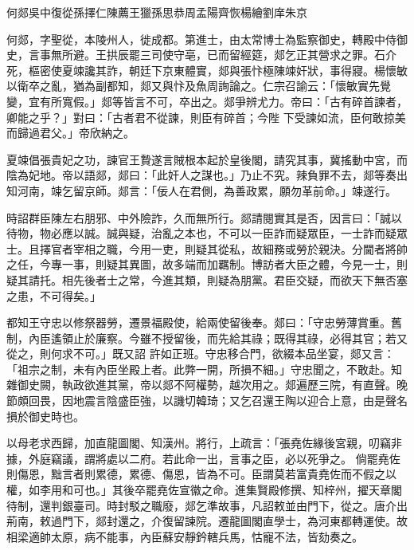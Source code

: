 
\begin{pinyinscope}

 何郯吳中復從孫擇仁陳薦王獵孫思恭周孟陽齊恢楊繪劉庠朱京



 何郯，字聖從，本陵州人，徙成都。第進士，由太常博士為監察御史，轉殿中侍御史，言事無所避。王拱辰罷三司使守亳，已而留經筵，郯乞正其營求之罪。石介死，樞密使夏竦讒其詐，朝廷下京東體實，郯與張忭極陳竦奸狀，事得寢。楊懷敏以衛卒之亂，猶為副都知，郯又與忭及魚周詢論之。仁宗召諭云：「懷敏實先覺變，宜有所寬假。」郯等皆言不可，卒出之。郯爭辨尤力。帝曰：「古有碎首諫者，卿能之乎？」對曰：「古者君不從諫，則臣有碎首；今陛
 下受諫如流，臣何敢掠美而歸過君父。」帝欣納之。



 夏竦倡張貴妃之功，諫官王贄遂言賊根本起於皇後閣，請究其事，冀搖動中宮，而陰為妃地。帝以語郯，郯曰：「此奸人之謀也。」乃止不究。辣負罪不去，郯等奏出知河南，竦乞留京師。郯言：「佞人在君側，為善政累，願勿革前命。」竦遂行。



 時詔群臣陳左右朋邪、中外險詐，久而無所行。郯請閱實其是否，因言曰：「誠以待物，物必應以誠。誠與疑，治亂之本也，不可以一臣詐而疑眾臣，一士詐而疑眾
 士。且擇官者宰相之職，今用一吏，則疑其從私，故細務或勞於親決。分閫者將帥之任，今專一事，則疑其異圖，故多端而加羈制。博訪者大臣之體，今見一士，則疑其請托。相先後者士之常，今進其類，則疑為朋黨。君臣交疑，而欲天下無否塞之患，不可得矣。」



 都知王守忠以修祭器勞，遷景福殿使，給兩使留後奉。郯曰：「守忠勞薄賞重。舊制，內臣遙領止於廉察。今雖不授留後，而先給其祿；既得其祿，必得其官；若又從之，則何求不可。」既又詔
 許如正班。守忠移合門，欲綴本品坐宴，郯又言：「祖宗之制，未有內臣坐殿上者。此弊一開，所損不細。」守忠聞之，不敢赴。知雜御史闕，執政欲進其黨，帝以郯不阿權勢，越次用之。郯遍歷三院，有直聲。晚節頗回畏，因地震言陰盛臣強，以譏切韓琦；又乞召還王陶以迎合上意，由是聲名損於御史時也。



 以母老求西歸，加直龍圖閣、知漢州。將行，上疏言：「張堯佐緣後宮親，叨竊非據，外庭竊議，謂將處以二府。若此命一出，言事之臣，必以死爭之。
 倘罷堯佐則傷恩，黜言者則累德，累德、傷恩，皆為不可。臣謂莫若富貴堯佐而不假之以權，如李用和可也。」其後卒罷堯佐宣徽之命。進集賢殿修撰、知梓州，擢天章閣待制，還判銀臺司。時封駁之職廢，郯乞準故事，凡詔敕並由門下，從之。唐介出荊南，敕過門下，郯封還之，介復留諫院。遷龍圖閣直學士，為河東都轉運使。故相梁適帥太原，病不能事，內臣蘇安靜鈐轄兵馬，怙寵不法，皆劾奏之。




\end{pinyinscope}
